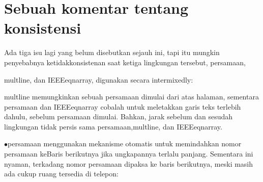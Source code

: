 \section {Sebuah komentar tentang konsistensi} 
Ada tiga isu lagi yang belum disebutkan sejauh ini, tapi itu mungkin penyebabnya ketidakkonsistenan saat ketiga lingkungan tersebut, persamaan, \par
\noindent 
multline, dan IEEEeqnarray, digunakan secara intermixedly: \par
\noindent 
 multline memungkinkan sebuah persamaan dimulai dari atas halaman, sementara persamaan dan IEEEeqnarray cobalah untuk meletakkan garis teks terlebih dahulu, sebelum persamaan dimulai. Bahkan, jarak sebelum dan sesudah lingkungan tidak persis sama persamaan,multline, dan IEEEeqnarray. \par
\noindent 
  $ \bullet $persamaan menggunakan mekanisme otomatis untuk memindahkan nomor persamaan keBaris berikutnya jika ungkapannya terlalu panjang. Sementara ini nyaman, terkadang nomor persamaan dipaksa ke baris berikutnya, meski masih ada cukup ruang tersedia di telepon: \par
